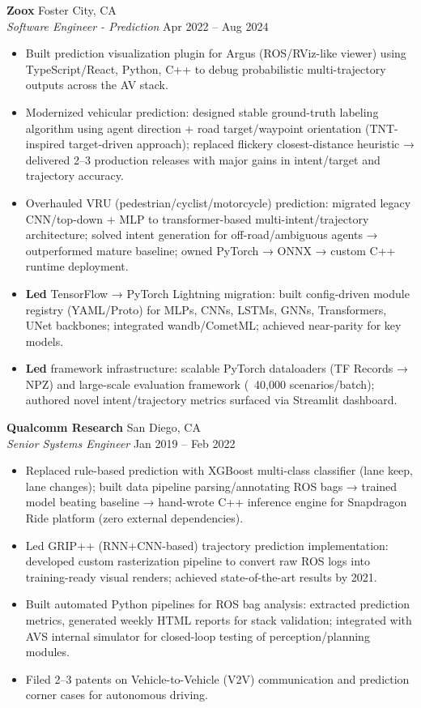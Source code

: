 \documentclass[10pt,letterpaper]{article}
\begin{document}
\textbf{Zoox} \hfill Foster City, CA \\
\textit{Software Engineer - Prediction} \hfill Apr 2022 -- Aug 2024
\begin{itemize}
    \item Built prediction visualization plugin for Argus (ROS/RViz-like viewer) using TypeScript/React, Python, C++ to debug probabilistic multi-trajectory outputs across the AV stack.
    \item Modernized vehicular prediction: designed stable ground-truth labeling algorithm using agent direction + road target/waypoint orientation (TNT-inspired target-driven approach); replaced flickery closest-distance heuristic → delivered 2--3 production releases with major gains in intent/target and trajectory accuracy.
    \item Overhauled VRU (pedestrian/cyclist/motorcycle) prediction: migrated legacy CNN/top-down + MLP to transformer-based multi-intent/trajectory architecture; solved intent generation for off-road/ambiguous agents → outperformed mature baseline; owned PyTorch → ONNX → custom C++ runtime deployment.
    \item \textbf{Led} TensorFlow → PyTorch Lightning migration: built config-driven module registry (YAML/Proto) for MLPs, CNNs, LSTMs, GNNs, Transformers, UNet backbones; integrated wandb/CometML; achieved near-parity for key models.
    \item \textbf{Led} framework infrastructure: scalable PyTorch dataloaders (TF Records → NPZ) and large-scale evaluation framework (~40,000 scenarios/batch); authored novel intent/trajectory metrics surfaced via Streamlit dashboard.
\end{itemize}

\textbf{Qualcomm Research} \hfill San Diego, CA \\
\textit{Senior Systems Engineer} \hfill Jan 2019 -- Feb 2022
\begin{itemize}
    \item Replaced rule-based prediction with XGBoost multi-class classifier (lane keep, lane changes); built data pipeline parsing/annotating ROS bags → trained model beating baseline → hand-wrote C++ inference engine for Snapdragon Ride platform (zero external dependencies).
    \item Led GRIP++ (RNN+CNN-based) trajectory prediction implementation: developed custom rasterization pipeline to convert raw ROS logs into training-ready visual renders; achieved state-of-the-art results by 2021.
    \item Built automated Python pipelines for ROS bag analysis: extracted prediction metrics, generated weekly HTML reports for stack validation; integrated with AVS internal simulator for closed-loop testing of perception/planning modules.
    \item Filed 2--3 patents on Vehicle-to-Vehicle (V2V) communication and prediction corner cases for autonomous driving.
\end{itemize}
\end{document}
